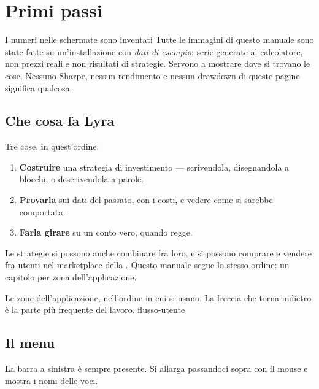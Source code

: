 \chapter{Primi passi}\label{cap:primi-passi}

\begin{attenzione}{I numeri nelle schermate sono inventati}
Tutte le immagini di questo manuale sono state fatte su un'installazione con
\emph{dati di esempio}: serie generate al calcolatore, non prezzi reali e non
risultati di strategie. Servono a mostrare dove si trovano le cose. Nessuno
Sharpe, nessun rendimento e nessun drawdown di queste pagine significa
qualcosa.
\end{attenzione}

\section{Che cosa fa Lyra}\label{sez:cosa-fa}

Tre cose, in quest'ordine:

\begin{enumerate}
  \item \textbf{Costruire} una strategia di investimento --- scrivendola,
        disegnandola a blocchi, o descrivendola a parole.
  \item \textbf{Provarla} sui dati del passato, con i costi, e vedere come si
        sarebbe comportata.
  \item \textbf{Farla girare} su un conto vero, quando regge.
\end{enumerate}

\noindent
Le strategie si possono anche combinare fra loro, e si possono comprare e
vendere fra utenti nel marketplace della . Questo manuale
segue lo stesso ordine: un capitolo per zona dell'applicazione.

  {Le zone dell'applicazione, nell'ordine in cui si usano. La freccia che
   torna indietro è la parte più frequente del lavoro.}
  {flusso-utente}

\section{Il menu}\label{sez:menu}

La barra a sinistra è sempre presente. Si allarga passandoci sopra con il
mouse e mostra i nomi delle voci.

